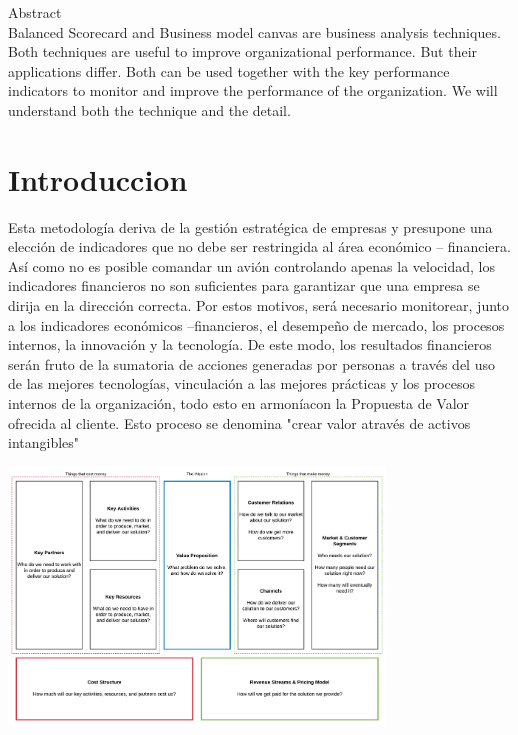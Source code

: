 


 Abstract\\
Balanced Scorecard and Business model canvas are business analysis techniques. Both techniques are useful to improve organizational performance. But their applications differ. Both can be used together with the key performance indicators to monitor and improve the performance of the organization. We will understand both the technique and the detail.
\newpage

\section{Introduccion}
Esta metodología deriva de la gestión estratégica de empresas y presupone una elección de indicadores que no debe ser restringida al área económico – financiera. Así como no es posible comandar un avión controlando apenas la velocidad, los indicadores financieros no son suficientes para garantizar que una empresa se dirija en la dirección correcta. Por estos motivos, será necesario monitorear, junto a los indicadores económicos –financieros, el desempeño de mercado, los procesos internos, la innovación y la tecnología. De este modo, los resultados financieros serán fruto de la sumatoria de acciones generadas por personas a través del uso de las mejores tecnologías, vinculación a las mejores prácticas y los procesos internos de la organización, todo esto en armoníacon la Propuesta de Valor ofrecida al cliente. Esto proceso se denomina "crear valor através de activos intangibles"

\begin{center}
\includegraphics[width=10cm]{./Imagenes/imagen5}
\end{center}

